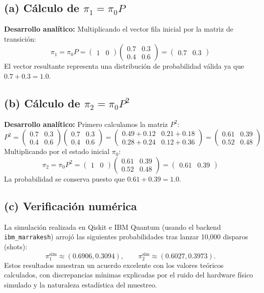 \documentclass[12pt,a4paper]{article}
\begin{document}
\subsection{(a) Cálculo de \(\pi_1 = \pi_0 P\)}
\textbf{Desarrollo analítico:}
Multiplicando el vector fila inicial por la matriz de transición:
\[
\pi_1 = \pi_0 P =
\begin{pmatrix}
1 & 0
\end{pmatrix}
\begin{pmatrix}
0.7 & 0.3\\
0.4 & 0.6
\end{pmatrix}
=
\begin{pmatrix}
0.7 & 0.3
\end{pmatrix}
\]
El vector resultante representa una distribución de probabilidad válida ya que \(0.7 + 0.3 = 1.0\).

\subsection{(b) Cálculo de \(\pi_2 = \pi_0 P^2\)}
\textbf{Desarrollo analítico:}
Primero calculamos la matriz \(P^2\):
\[
P^2 =
\begin{pmatrix}
0.7 & 0.3\\
0.4 & 0.6
\end{pmatrix}
\begin{pmatrix}
0.7 & 0.3\\
0.4 & 0.6
\end{pmatrix}
=
\begin{pmatrix}
0.49 + 0.12 & 0.21 + 0.18\\
0.28 + 0.24 & 0.12 + 0.36
\end{pmatrix}
=
\begin{pmatrix}
0.61 & 0.39\\
0.52 & 0.48
\end{pmatrix}
\]
Multiplicando por el estado inicial \(\pi_0\):
\[
\pi_2 = \pi_0 P^2 =
\begin{pmatrix}
1 & 0
\end{pmatrix}
\begin{pmatrix}
0.61 & 0.39\\
0.52 & 0.48
\end{pmatrix}
=
\begin{pmatrix}
0.61 & 0.39
\end{pmatrix}
\]
La probabilidad se conserva puesto que \(0.61 + 0.39 = 1.0\).

\subsection{(c) Verificación numérica}
La simulación realizada en Qiskit e IBM Quantum (usando el backend \texttt{ibm\_marrakesh}) arrojó las siguientes probabilidades tras lanzar 10,000 disparos (shots):
\[
\pi_1^{\text{sim}} \approx (0.6906, 0.3094),
\qquad
\pi_2^{\text{sim}} \approx (0.6027, 0.3973).
\]
Estos resultados muestran un acuerdo excelente con los valores teóricos calculados, con discrepancias mínimas explicadas por el ruido del hardware físico simulado y la naturaleza estadística del muestreo.
\end{document}
